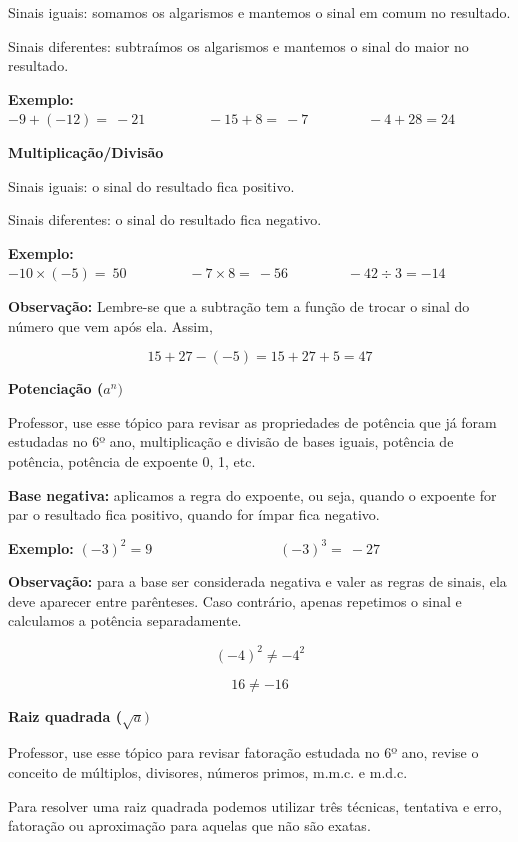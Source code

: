 Sinais iguais: somamos os algarismos e mantemos o sinal em comum no
resultado.

Sinais diferentes: subtraímos os algarismos e mantemos o sinal do maior
no resultado.

\textbf{Exemplo:}
\(- 9 + \left( - 12 \right) = \  - 21\ \ \ \ \ \ \ \ \ \ \ \ \ \ \ \ \ \ \ \  - 15 + 8 = \  - 7\ \ \ \ \ \ \ \ \ \ \ \ \ \ \ \ \ \ \  - 4 + 28 = 24\)

\textbf{Multiplicação/Divisão}

Sinais iguais: o sinal do resultado fica positivo.

Sinais diferentes: o sinal do resultado fica negativo.

\textbf{Exemplo:}
\(- 10 \times \left( - 5 \right) = \ 50\ \ \ \ \ \ \ \ \ \ \ \ \ \ \ \ \ \ \ \  - 7 \times 8 = \  - 56\ \ \ \ \ \ \ \ \ \ \ \ \ \ \ \ \ \ \  - 42 \div 3 = - 14\)

\textbf{Observação:} Lembre-se que a subtração tem a função de trocar o
sinal do número que vem após ela. Assim,

\[15 + 27 - \left( - 5 \right) = 15 + 27 + 5 = 47\]

\textbf{Potenciação (}\(a^{n})\)

Professor, use esse tópico para revisar as propriedades de potência que
já foram estudadas no 6º ano, multiplicação e divisão de bases iguais,
potência de potência, potência de expoente 0, 1, etc.

\textbf{Base negativa:} aplicamos a regra do expoente, ou seja, quando o
expoente for par o resultado fica positivo, quando for ímpar fica
negativo.

\textbf{\hfill\break
Exemplo:}
\(\left( - 3 \right)^{2} = 9\ \ \ \ \ \ \ \ \ \ \ \ \ \ \ \ \ \ \ \ \ \ \ \ \ \ \ \ \ \ \ \ \ \ \ \ \ \ \ \ \ \left( - 3 \right)^{3} = \  - 27\ \ \ \ \ \ \ \)

\textbf{Observação:} para a base ser considerada negativa e valer as
regras de sinais, ela deve aparecer entre parênteses. Caso contrário,
apenas repetimos o sinal e calculamos a potência separadamente.

\[\left( - 4 \right)^{2} \neq - 4^{2}\]

\[16 \neq - 16\]

\textbf{Raiz quadrada (}\(\sqrt{a})\)

Professor, use esse tópico para revisar fatoração estudada no 6º ano,
revise o conceito de múltiplos, divisores, números primos, m.m.c. e
m.d.c.

Para resolver uma raiz quadrada podemos utilizar três técnicas,
tentativa e erro, fatoração ou aproximação para aquelas que não são
exatas.

